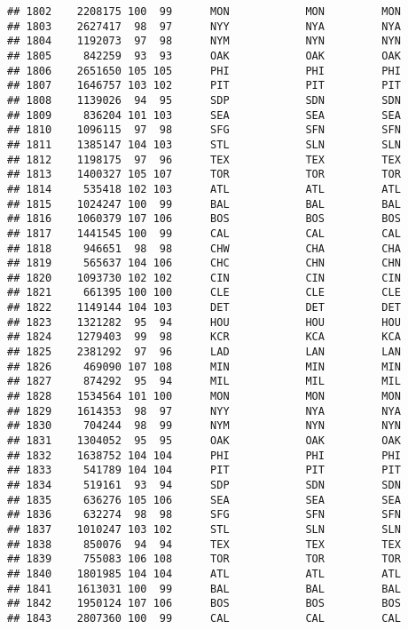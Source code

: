 \documentclass[]{article}
\begin{document}
\begin{verbatim}
## 1802    2208175 100  99      MON            MON         MON
## 1803    2627417  98  97      NYY            NYA         NYA
## 1804    1192073  97  98      NYM            NYN         NYN
## 1805     842259  93  93      OAK            OAK         OAK
## 1806    2651650 105 105      PHI            PHI         PHI
## 1807    1646757 103 102      PIT            PIT         PIT
## 1808    1139026  94  95      SDP            SDN         SDN
## 1809     836204 101 103      SEA            SEA         SEA
## 1810    1096115  97  98      SFG            SFN         SFN
## 1811    1385147 104 103      STL            SLN         SLN
## 1812    1198175  97  96      TEX            TEX         TEX
## 1813    1400327 105 107      TOR            TOR         TOR
## 1814     535418 102 103      ATL            ATL         ATL
## 1815    1024247 100  99      BAL            BAL         BAL
## 1816    1060379 107 106      BOS            BOS         BOS
## 1817    1441545 100  99      CAL            CAL         CAL
## 1818     946651  98  98      CHW            CHA         CHA
## 1819     565637 104 106      CHC            CHN         CHN
## 1820    1093730 102 102      CIN            CIN         CIN
## 1821     661395 100 100      CLE            CLE         CLE
## 1822    1149144 104 103      DET            DET         DET
## 1823    1321282  95  94      HOU            HOU         HOU
## 1824    1279403  99  98      KCR            KCA         KCA
## 1825    2381292  97  96      LAD            LAN         LAN
## 1826     469090 107 108      MIN            MIN         MIN
## 1827     874292  95  94      MIL            MIL         MIL
## 1828    1534564 101 100      MON            MON         MON
## 1829    1614353  98  97      NYY            NYA         NYA
## 1830     704244  98  99      NYM            NYN         NYN
## 1831    1304052  95  95      OAK            OAK         OAK
## 1832    1638752 104 104      PHI            PHI         PHI
## 1833     541789 104 104      PIT            PIT         PIT
## 1834     519161  93  94      SDP            SDN         SDN
## 1835     636276 105 106      SEA            SEA         SEA
## 1836     632274  98  98      SFG            SFN         SFN
## 1837    1010247 103 102      STL            SLN         SLN
## 1838     850076  94  94      TEX            TEX         TEX
## 1839     755083 106 108      TOR            TOR         TOR
## 1840    1801985 104 104      ATL            ATL         ATL
## 1841    1613031 100  99      BAL            BAL         BAL
## 1842    1950124 107 106      BOS            BOS         BOS
## 1843    2807360 100  99      CAL            CAL         CAL

\end{verbatim}
\end{document}
